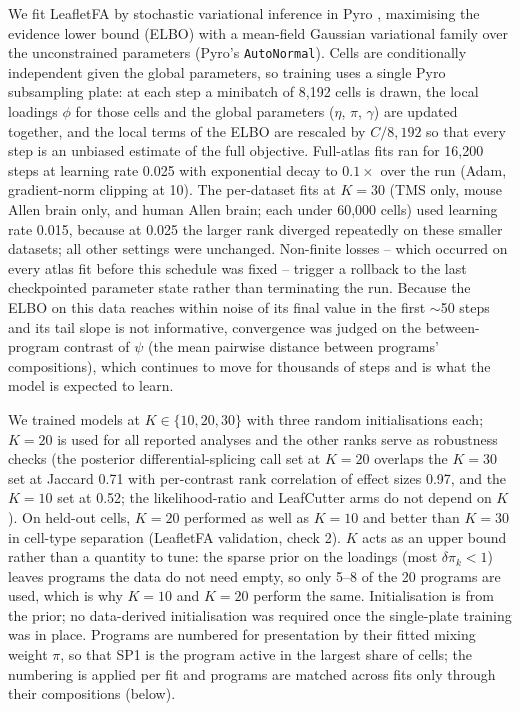 We fit LeafletFA by stochastic variational inference in Pyro \cite{pyro}, maximising the evidence lower bound (ELBO) with a mean-field Gaussian variational family over the unconstrained parameters (Pyro's \texttt{AutoNormal}). Cells are conditionally independent given the global parameters, so training uses a single Pyro subsampling plate: at each step a minibatch of 8{,}192 cells is drawn, the local loadings $\phi$ for those cells and the global parameters ($\eta$, $\pi$, $\gamma$) are updated together, and the local terms of the ELBO are rescaled by $C/8{,}192$ so that every step is an unbiased estimate of the full objective. Full-atlas fits ran for 16{,}200 steps at learning rate 0.025 with exponential decay to $0.1\times$ over the run (Adam, gradient-norm clipping at 10). The per-dataset fits at $K = 30$ (TMS only, mouse Allen brain only, and human Allen brain; each under 60{,}000 cells) used learning rate 0.015, because at 0.025 the larger rank diverged repeatedly on these smaller datasets; all other settings were unchanged. Non-finite losses -- which occurred on every atlas fit before this schedule was fixed -- trigger a rollback to the last checkpointed parameter state rather than terminating the run. Because the ELBO on this data reaches within noise of its final value in the first $\sim$50 steps and its tail slope is not informative, convergence was judged on the between-program contrast of $\psi$ (the mean pairwise distance between programs' compositions), which continues to move for thousands of steps and is what the model is expected to learn.

We trained models at $K \in \{10, 20, 30\}$ with three random initialisations each; $K = 20$ is used for all reported analyses and the other ranks serve as robustness checks (the posterior differential-splicing call set at $K=20$ overlaps the $K=30$ set at Jaccard 0.71 with per-contrast rank correlation of effect sizes 0.97, and the $K=10$ set at 0.52; the likelihood-ratio and LeafCutter arms do not depend on $K$). On held-out cells, $K = 20$ performed as well as $K = 10$ and better than $K = 30$ in cell-type separation (LeafletFA validation, check 2). $K$ acts as an upper bound rather than a quantity to tune: the sparse prior on the loadings (most $\delta\pi_k < 1$) leaves programs the data do not need empty, so only 5--8 of the 20 programs are used, which is why $K = 10$ and $K = 20$ perform the same. Initialisation is from the prior; no data-derived initialisation was required once the single-plate training was in place. Programs are numbered for presentation by their fitted mixing weight $\pi$, so that SP1 is the program active in the largest share of cells; the numbering is applied per fit and programs are matched across fits only through their compositions (below).

